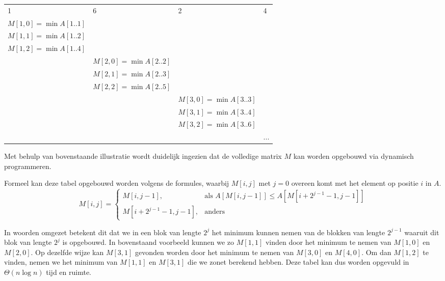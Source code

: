 { \centering
{ \footnotesize
\begin{tabular}{x{2cm}x{2cm}x{2cm}x{3cm}}
1 & 6 & 2 & 4\\

 &  &  &  \\
 &  &  \\
\\

&   &  & \\
&   & \\
&   \\

& &   & \\
& &  \\
& &   \\

& & & ... \\
\end{tabular}
}
}

Met behulp van bovenstaande illustratie wordt duidelijk ingezien dat de
volledige matrix $M$ kan worden opgebouwd via dynamisch programmeren.

Formeel kan deze tabel opgebouwd worden volgens de formules, waarbij $M[i,j]$ 
met $j = 0$ overeen komt met het element op positie $i$ in $A$. 
\begin{equation*}
M[i,j] =
\begin{cases}
 M[i, j - 1], & \text{als } A[M[i,j - 1]] \leq A[M[i+2^{j - 1}-1, j - 1]]\\
 M[i + 2^{j-1}-1, j-1], & \text{anders} 
\end{cases}
\end{equation*}

In woorden omgezet betekent dit dat we in een blok van lengte $2^j$ het minimum
kunnen nemen van de blokken van lengte $2^{j-1}$ waaruit dit blok van lengte
$2^j$ is opgebouwd. In bovenstaand voorbeeld kunnen we zo $M[1,1]$ vinden door
het minimum te nemen van $M[1,0]$ en $M[2,0]$. Op dezelfde wijze kan $M[3,1]$
gevonden worden door het minimum te nemen van $M[3,0]$ en $M[4,0]$. Om dan
$M[1,2]$ te vinden, nemen we het minimum van $M[1,1]$ en $M[3,1]$ die we zonet
berekend hebben. Deze tabel kan dus worden opgevuld in $\Theta(n\log{n})$ tijd
en ruimte.

